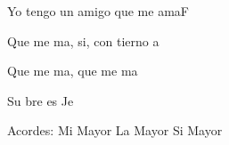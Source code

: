 \documentclass[12pt, spanish]{book}
\begin{document}
\begin{song}{Yo tengo un amigo que me ama}{F}
\begin{SBExtraKeys}
{\begin{SBOpGroup}
                Que me ma, si, con tierno a

                Que me ma, que me ma

                Su bre es Je
            \end{SBOpGroup}

            \ifChordBk
            \begin{SBOpGroup}
                Acordes:\break
                \upchord{\E}\qquad Mi Mayor \hfill
                \upchord{\A}\qquad La Mayor \hfill\null\break
                \upchord{\B}\qquad Si Mayor \hfill\null\break
            \end{SBOpGroup}
            \fi
        }\end{SBExtraKeys}
    \end{song}


    \ifChordBk
        
        \theendnotes
        
        
        
    \fi

    
\end{document}
